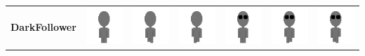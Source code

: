 \documentclass[../Main.tex]{subfiles}
\begin{document}
\begin{center}
\begin{tabular}{ | m{} | m{} m{} m{} m{} m{} m{} | }
                    \multirow{2}{*}{\textbf{DarkFollower}} & \centerline{\includegraphics[scale=3]{../res/textures/entities/followers/dark/North.png}} & \centerline{\includegraphics[scale=3]{../res/textures/entities/followers/dark/North-Walk-1.png}} & \centerline{\includegraphics[scale=3]{../res/textures/entities/followers/dark/North-Walk-2.png}} & \centerline{\includegraphics[scale=3]{../res/textures/entities/followers/dark/South.png}} & \centerline{\includegraphics[scale=3]{../res/textures/entities/followers/dark/South-Walk-1.png}} & \centerline{\includegraphics[scale=3]{../res/textures/entities/followers/dark/South-Walk-2.png}} \\

\end{tabular}
\end{center}
\end{document}
